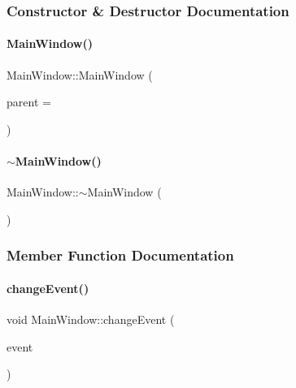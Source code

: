 \subsubsection{Constructor \& Destructor Documentation}
\mbox{\label{classMainWindow_a8b244be8b7b7db1b08de2a2acb9409db}} 
\paragraph{\texorpdfstring{Main\+Window()}{MainWindow()}}
{\footnotesize\ttfamily Main\+Window\+::\+Main\+Window (\begin{DoxyParamCaption}\item[{Q\+Widget $\ast$}]{parent = {} }\end{DoxyParamCaption})\hspace{0.3cm}{\ttfamily [explicit]}}

\mbox{\label{classMainWindow_ae98d00a93bc118200eeef9f9bba1dba7}} 
\paragraph{\texorpdfstring{$\sim$\+Main\+Window()}{~MainWindow()}}
{\footnotesize\ttfamily Main\+Window\+::$\sim$\+Main\+Window (\begin{DoxyParamCaption}{ }\end{DoxyParamCaption})}



\subsubsection{Member Function Documentation}
\mbox{\label{classMainWindow_ac7c881667b4ba4986b5a0030452ee3f0}} 
\paragraph{\texorpdfstring{change\+Event()}{changeEvent()}}
{\footnotesize\ttfamily void Main\+Window\+::change\+Event (\begin{DoxyParamCaption}\item[{Q\+Event $\ast$}]{event }\end{DoxyParamCaption})\hspace{0.3cm}{\ttfamily [protected]}}

